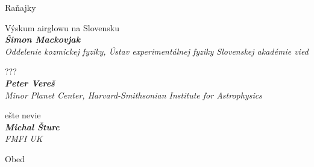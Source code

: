 \documentclass[a4paper]{report}
\begin{document}
                    \begin{tcolorbox}[
                                    colback=red!10,
                    colframe=red!50!black,
                                fonttitle=\Large\bfseries,
                title=09:00
            ]
                {\Large Raňajky}
                                                            \end{tcolorbox}
                    \begin{tcolorbox}[
                                    colback=white,
                    colframe=black!70!white,
                                fonttitle=\Large\bfseries,
                title=10:00
            ]
                {\Large Výskum airglowu na Slovensku}
                                                            \\ \textbf{\textit{Šimon Mackovjak}}
                                                    \\ \textit{Oddelenie kozmickej fyziky, Ústav experimentálnej fyziky Slovenskej akadémie vied}                            \end{tcolorbox}
                    \begin{tcolorbox}[
                                    colback=white,
                    colframe=black!70!white,
                                fonttitle=\Large\bfseries,
                title=10:30
            ]
                {\Large ???}
                                                            \\ \textbf{\textit{Peter Vereš}}
                                                    \\ \textit{Minor Planet Center, Harvard-Smithsonian Institute for Astrophysics}                            \end{tcolorbox}
                    \begin{tcolorbox}[
                                    colback=white,
                    colframe=black!70!white,
                                fonttitle=\Large\bfseries,
                title=11:00
            ]
                {\Large ešte nevie}
                                                            \\ \textbf{\textit{Michal Šturc}}
                                                    \\ \textit{FMFI UK}                            \end{tcolorbox}
                    \begin{tcolorbox}[
                                    colback=red!10,
                    colframe=red!50!black,
                                fonttitle=\Large\bfseries,
                title=12:30
            ]
                {\Large Obed}
                                                            \end{tcolorbox}
\end{document}
